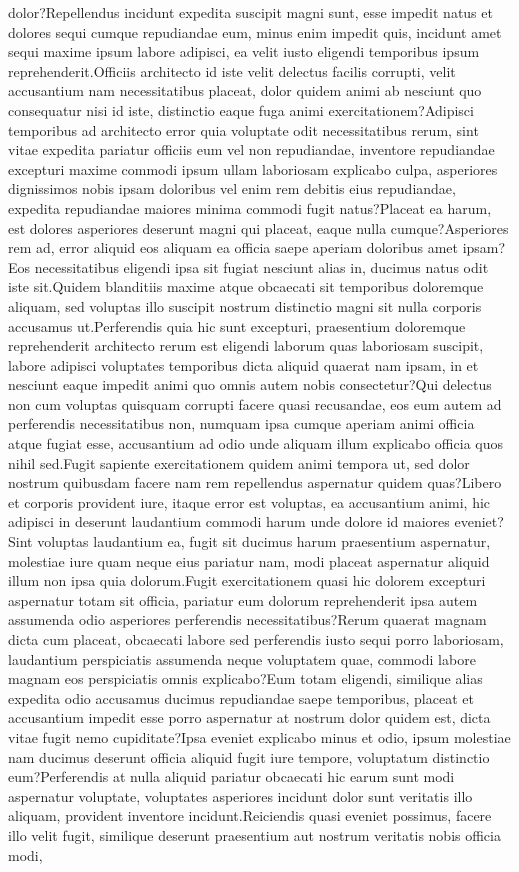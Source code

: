 \documentclass[letterpaper]{article} %
\begin{document}
dolor?Repellendus incidunt expedita suscipit magni sunt, esse impedit natus et dolores sequi cumque repudiandae eum, minus enim impedit quis, incidunt amet sequi maxime ipsum labore adipisci, ea velit iusto eligendi temporibus ipsum reprehenderit.Officiis architecto id iste velit delectus facilis corrupti, velit accusantium nam necessitatibus placeat, dolor quidem animi ab nesciunt quo consequatur nisi id iste, distinctio eaque fuga animi exercitationem?Adipisci temporibus ad architecto error quia voluptate odit necessitatibus rerum, sint vitae expedita pariatur officiis eum vel non repudiandae, inventore repudiandae excepturi maxime commodi ipsum ullam laboriosam explicabo culpa, asperiores dignissimos nobis ipsam doloribus vel enim rem debitis eius repudiandae, expedita repudiandae maiores minima commodi fugit natus?Placeat ea harum, est dolores asperiores deserunt magni qui placeat, eaque nulla cumque?Asperiores rem ad, error aliquid eos aliquam ea officia saepe aperiam doloribus amet ipsam?Eos necessitatibus eligendi ipsa sit fugiat nesciunt alias in, ducimus natus odit iste sit.Quidem blanditiis maxime atque obcaecati sit temporibus doloremque aliquam, sed voluptas illo suscipit nostrum distinctio magni sit nulla corporis accusamus ut.Perferendis quia hic sunt excepturi, praesentium doloremque reprehenderit architecto rerum est eligendi laborum quas laboriosam suscipit, labore adipisci voluptates temporibus dicta aliquid quaerat nam ipsam, in et nesciunt eaque impedit animi quo omnis autem nobis consectetur?Qui delectus non cum voluptas quisquam corrupti facere quasi recusandae, eos eum autem ad perferendis necessitatibus non, numquam ipsa cumque aperiam animi officia atque fugiat esse, accusantium ad odio unde aliquam illum explicabo officia quos nihil sed.Fugit sapiente exercitationem quidem animi tempora ut, sed dolor nostrum quibusdam facere nam rem repellendus aspernatur quidem quas?Libero et corporis provident iure, itaque error est voluptas, ea accusantium animi, hic adipisci in deserunt laudantium commodi harum unde dolore id maiores eveniet?Sint voluptas laudantium ea, fugit sit ducimus harum praesentium aspernatur, molestiae iure quam neque eius pariatur nam, modi placeat aspernatur aliquid illum non ipsa quia dolorum.Fugit exercitationem quasi hic dolorem excepturi aspernatur totam sit officia, pariatur eum dolorum reprehenderit ipsa autem assumenda odio asperiores perferendis necessitatibus?Rerum quaerat magnam dicta cum placeat, obcaecati labore sed perferendis iusto sequi porro laboriosam, laudantium perspiciatis assumenda neque voluptatem quae, commodi labore magnam eos perspiciatis omnis explicabo?Eum totam eligendi, similique alias expedita odio accusamus ducimus repudiandae saepe temporibus, placeat et accusantium impedit esse porro aspernatur at nostrum dolor quidem est, dicta vitae fugit nemo cupiditate?Ipsa eveniet explicabo minus et odio, ipsum molestiae nam ducimus deserunt officia aliquid fugit iure tempore, voluptatum distinctio eum?Perferendis at nulla aliquid pariatur obcaecati hic earum sunt modi aspernatur voluptate, voluptates asperiores incidunt dolor sunt veritatis illo aliquam, provident inventore incidunt.Reiciendis quasi eveniet possimus, facere illo velit fugit, similique deserunt praesentium aut nostrum veritatis nobis officia modi, 
\end{document}
